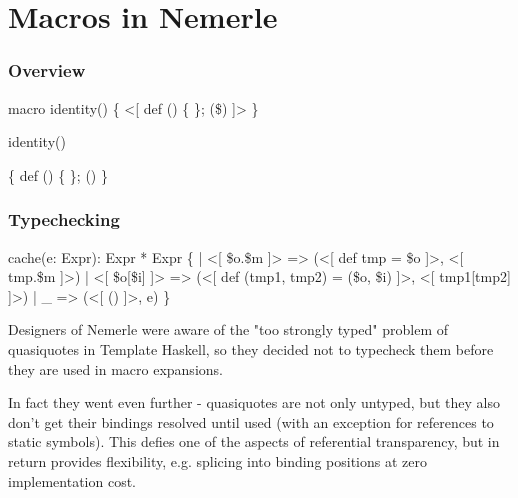 \documentclass[hyperref={bookmarks=false}]{beamer}
\begin{document}
\section{Macros in Nemerle}

\begin{frame}[fragile]
\frametitle{Overview}

\begin{lstlistinglike}
\begin{semiverbatim}
\alert<1>{macro} identity() \{
  <[ def (\only<1>{x}\only<2>{\text{\color{blue}{x}}}) \{  \}; (\$) ]>
\}

identity\alert<1>{(}\alert<1>{)}

\{
  def (\only<1>{x_43}\only<2>{\text{\color{blue}{x_43}}}) \{  \};
  ()
\}
\end{semiverbatim}
\end{lstlistinglike}


\end{frame}

\begin{frame}[fragile]
\frametitle{Typechecking}

\begin{lstlistinglike}
\begin{semiverbatim}
cache(e: Expr): Expr * Expr \{
  | <[ \$o.\$m ]> => (<[ def tmp = \$o ]>, <[ tmp.\$m ]>)
  | <[ \$o[\$i] ]> => (<[ def (tmp1, tmp2) = (\$o, \$i) ]>,
                     <[ tmp1[tmp2] ]>)
  | _ => (<[ () ]>, e)
\}
\end{semiverbatim}
\end{lstlistinglike}

Designers of Nemerle were aware of the "too strongly typed" problem of quasiquotes
in Template Haskell, so they decided not to typecheck them before they are used
in macro expansions.

In fact they went even further - quasiquotes are not only untyped, but they also
don't get their bindings resolved until used (with an exception for
references to static symbols). This defies one of the aspects of referential transparency,
but in return provides flexibility, e.g. splicing into binding positions at zero implementation cost.
\end{frame}
\end{document}
